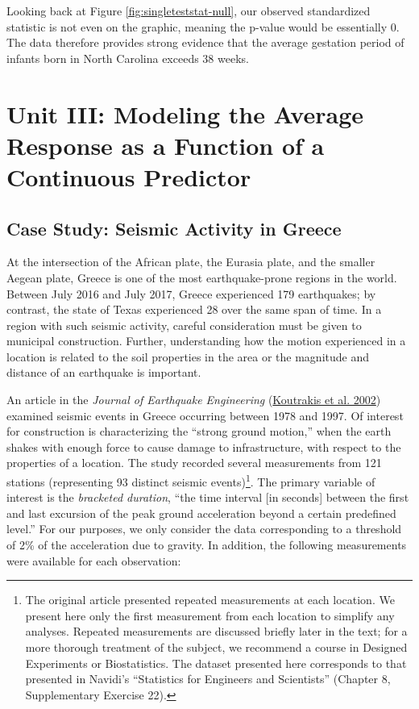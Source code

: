 \documentclass[
]{book}
\theoremstyle{plain}
\theoremstyle{mydefn}
\theoremstyle{myexmpl}
\theoremstyle{remark}
\begin{document}
Looking back at Figure \ref{fig:singleteststat-null}, our observed standardized statistic is not even on the graphic, meaning the p-value would be essentially 0. The data therefore provides strong evidence that the average gestation period of infants born in North Carolina exceeds 38 weeks.

\hypertarget{part-unit-iii-modeling-the-average-response-as-a-function-of-a-continuous-predictor}{%
\part{Unit III: Modeling the Average Response as a Function of a Continuous Predictor}\label{part-unit-iii-modeling-the-average-response-as-a-function-of-a-continuous-predictor}}

\hypertarget{CaseGreece}{%
\chapter{Case Study: Seismic Activity in Greece}\label{CaseGreece}}

At the intersection of the African plate, the Eurasia plate, and the smaller Aegean plate, Greece is one of the most earthquake-prone regions in the world. Between July 2016 and July 2017, Greece experienced 179 earthquakes; by contrast, the state of Texas experienced 28 over the same span of time. In a region with such seismic activity, careful consideration must be given to municipal construction. Further, understanding how the motion experienced in a location is related to the soil properties in the area or the magnitude and distance of an earthquake is important.

An article in the \emph{Journal of Earthquake Engineering} (\protect\hyperlink{ref-Koutrakis2002}{Koutrakis et al. 2002}) examined seismic events in Greece occurring between 1978 and 1997. Of interest for construction is characterizing the ``strong ground motion,'' when the earth shakes with enough force to cause damage to infrastructure, with respect to the properties of a location. The study recorded several measurements from 121 stations (representing 93 distinct seismic events)\footnote{The original article presented repeated measurements at each location. We present here only the first measurement from each location to simplify any analyses. Repeated measurements are discussed briefly later in the text; for a more thorough treatment of the subject, we recommend a course in Designed Experiments or Biostatistics. The dataset presented here corresponds to that presented in Navidi's ``Statistics for Engineers and Scientists'' (Chapter 8, Supplementary Exercise 22).}. The primary variable of interest is the \emph{bracketed duration}, ``the time interval {[}in seconds{]} between the first and last excursion of the peak ground acceleration beyond a certain predefined level.'' For our purposes, we only consider the data corresponding to a threshold of 2\% of the acceleration due to gravity. In addition, the following measurements were available for each observation:
\end{document}
